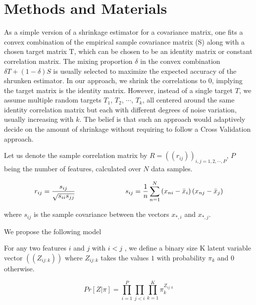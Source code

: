 \section{Methods and Materials}

As a simple version of a shrinkage estimator for a covariance matrix, one fits a convex combination of the empirical sample covariance matrix (S) along with a chosen target matrix T, which can be chosen to be an  identity matrix or constant correlation matrix. The mixing proportion $\delta$ in the convex combination $\delta T + (1- \delta) S$ is usually selected to maximize the expected accuracy of the shrunken estimator. In our approach, we shrink the correlations to $0$, implying the target matrix is the identity matrix. However, instead of a single target $T$, we assume multiple random targets $T_1$, $T_2$, $\cdots$, $T_k$, all centered around the same identity correlation matrix but each with different degrees of noise variation, usually increasing with $k$. The belief is that such an approach would adaptively decide on the amount of shrinkage without requiring to follow a Cross Validation approach. 

Let us denote the sample correlation matrix by $R = ((r_{ij}))_{i, j = 1,2, \cdots, P} $, $P$ being the number of features, calculated over $N$ data samples.

\begin{equation}
r_{ij} = \frac{s_{ij}}{\sqrt{s_{ii} s_{jj}}}   \hspace{1 in} s_{ij} = \frac{1}{n} \sum_{n=1}^{N} \left ( x_{ni} - \bar{x}_{i} \right ) \left ( x_{nj} - \bar{x}_{j} \right ) 
\end{equation}

where $s_{ij}$ is the sample covariance between the vectors $x_{*,i}$ and $x_{*,j}$.

We propose the following model

For any two features $i$ and $j$ with $ i < j$ , we define a binary size K latent variable vector $((Z_{ij:k}))$  where $Z_{ij:k}$ takes the values $1$ with probability $\pi_{k}$ and $0$ otherwise. 


\begin{equation}
Pr \left [ Z | \pi \right ] = \prod_{i=1}^{P} \prod_{j < i} \prod_{k=1}^{K} \pi_{k}^{Z_{ij:k}}  
\end{equation}

